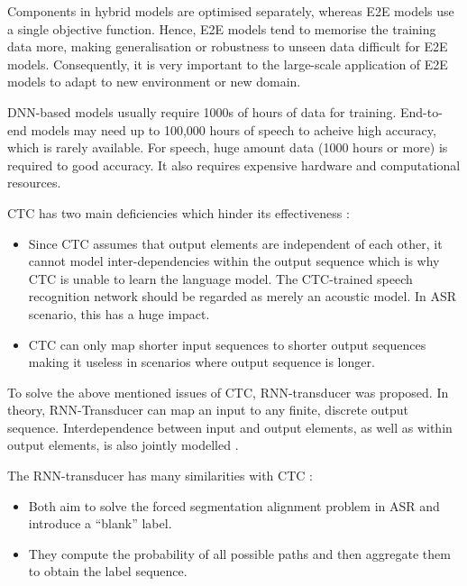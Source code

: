 Components in hybrid models are optimised separately, whereas E2E models use a single objective function. Hence, E2E models tend to memorise the training data more, making generalisation or robustness to unseen data difficult for E2E models. Consequently, it is very important to the large-scale application of E2E models to adapt to new environment or new domain.

DNN-based models usually require 1000s of hours of data for training. End-to-end models may need up to 100,000 hours of speech to acheive high accuracy, which is rarely available. For speech, huge amount data (1000 hours or more) is required to good accuracy. It also requires expensive hardware and computational resources. \cite{kincaid_state_2018}

    
CTC has two main deficiencies which hinder its effectiveness \cite{backstrom_introduction_2022}:
\begin{itemize}
    \item Since CTC assumes that output elements are independent of each other, it cannot model inter-dependencies within the output sequence which is why CTC is unable to learn the language model. The CTC-trained speech recognition network should be regarded as merely an acoustic model. In ASR scenario, this has a huge impact. 
    \item CTC can only map shorter input sequences to shorter output sequences making it useless in scenarios where output sequence is longer.
\end{itemize}

To solve the above mentioned issues of CTC, RNN-transducer was proposed. In theory, RNN-Transducer can map an input to any finite, discrete output sequence. Interdependence between input and output elements, as well as within output elements, is also jointly modelled \cite{backstrom_introduction_2022}.

The RNN-transducer has many similarities with CTC \cite{backstrom_introduction_2022}:

\begin{itemize}
    \item Both aim to solve the forced segmentation alignment problem in ASR and introduce a “blank” label. 
    \item They compute the probability of all possible paths and then aggregate them to obtain the label sequence. 
\end{itemize}

